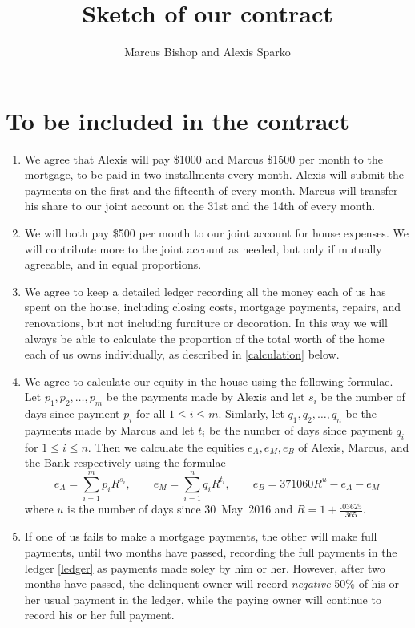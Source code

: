 \documentclass[12pt]{article}
\title{Sketch of our contract}
\author{Marcus Bishop and Alexis Sparko}
\begin{document}
\maketitle

\section{To be included in the contract}
\begin{enumerate}

\item We agree that Alexis will pay \$1000 and Marcus \$1500 per 
month to the mortgage, to be paid in two installments every month. 
Alexis will submit the payments on the first and the fifteenth of 
every month. Marcus will transfer his share to our joint account on 
the 31st and the 14th of every month.

\item We will both pay \$500 per month to our joint account for house 
expenses. We will contribute more to the joint account as needed, but 
only if mutually agreeable, and in equal proportions.

\item\label{ledger} We agree to keep a detailed ledger recording all 
the money each of us has spent on the house, including closing costs, 
mortgage payments, repairs, and renovations, but not including 
furniture or decoration. In this way we will always be able to calculate
the proportion of the total worth of the home each of us owns 
individually, as described in \autoref{calculation} below.

\item\label{calculation} We agree to calculate our equity in the house using
the following formulae. Let $p_1,p_2,\ldots,p_m$ be the payments
made by Alexis and let $s_i$ be the number of days since payment
$p_i$ for all $1\le i\le m$. Simlarly, let $q_1,q_2,\ldots,q_n$
be the payments made by Marcus and let $t_i$ be the number of days
since payment $q_i$ for $1\le i\le n$. Then we calculate
the equities $e_A,e_M,e_B$ of Alexis, Marcus, and the Bank respectively
using the formulae
\[e_A=\sum_{i=1}^mp_iR^{s_i},\qquad
e_M=\sum_{i=1}^nq_iR^{t_i},\qquad
e_B=371060R^u-e_A-e_M\]
where $u$ is the number of days since 30~May~2016 and
$R=1+\frac{.03625}{365}$.

\item If one of us fails to make a mortgage payments, the other will 
make full payments, until two months have passed, recording the full 
payments in the ledger \autoref{ledger}
as payments made soley by him or her.
However, after two months have passed,
the delinquent owner will record {\em negative} 50\% 
of his or her usual payment in the ledger, while the paying owner
will continue to record his or her full payment.


\end{enumerate}
\end{document}
